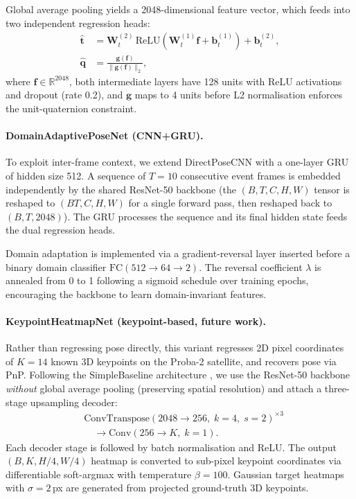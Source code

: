 \documentclass[10pt,twocolumn,letterpaper]{article}
\begin{document}
Global average pooling yields a 2048-dimensional feature vector, which
feeds into two independent regression heads:
\begin{align}
  \hat{\mathbf{t}} &= \mathbf{W}_t^{(2)}\,\text{ReLU}(\mathbf{W}_t^{(1)}\mathbf{f} + \mathbf{b}_t^{(1)}) + \mathbf{b}_t^{(2)}, \\
  \hat{\mathbf{q}} &= \frac{\mathbf{g}(\mathbf{f})}{\|\mathbf{g}(\mathbf{f})\|_2},
\end{align}
where $\mathbf{f}\in\mathbb{R}^{2048}$, both intermediate layers have
128 units with ReLU activations and dropout (rate 0.2), and
$\mathbf{g}$ maps to 4 units before L2 normalisation enforces
the unit-quaternion constraint.

\paragraph{DomainAdaptivePoseNet (CNN+GRU).}
\label{sec:gru}
To exploit inter-frame context, we extend DirectPoseCNN with a
one-layer GRU \cite{cho2014gru} of hidden size 512.
A sequence of $T=10$ consecutive event frames is embedded independently
by the shared ResNet-50 backbone (the $(B,T,C,H,W)$ tensor is reshaped
to $(BT,C,H,W)$ for a single forward pass, then reshaped back to
$(B,T,2048)$).  The GRU processes the sequence and its final hidden
state feeds the dual regression heads.

Domain adaptation is implemented via a gradient-reversal
layer \cite{ganin2016domain} inserted before a binary domain
classifier $\text{FC}(512\to64\to2)$.  The reversal coefficient
$\lambda$ is annealed from 0 to 1 following a sigmoid schedule
over training epochs, encouraging the backbone to learn
domain-invariant features.

\paragraph{KeypointHeatmapNet (keypoint-based, future work).}
\label{sec:kp}
Rather than regressing pose directly, this variant regresses 2D
pixel coordinates of $K=14$ known 3D keypoints on the Proba-2 satellite,
and recovers pose via PnP.
Following the SimpleBaseline architecture \cite{xiao2018simple},
we use the ResNet-50 backbone \emph{without} global average pooling
(preserving spatial resolution) and attach a three-stage upsampling
decoder:
\begin{align*}
  &\text{ConvTranspose}(2048{\to}256,\;k{=}4,\;s{=}2)^{\times 3} \\
  &\quad\longrightarrow \text{Conv}(256{\to}K,\;k{=}1).
\end{align*}
Each decoder stage is followed by batch normalisation and ReLU.
The output $(B, K, H/4, W/4)$ heatmap is converted to sub-pixel
keypoint coordinates via differentiable soft-argmax with temperature
$\beta=100$.  Gaussian target heatmaps with $\sigma=2$\,px are
generated from projected ground-truth 3D keypoints.
\end{document}
